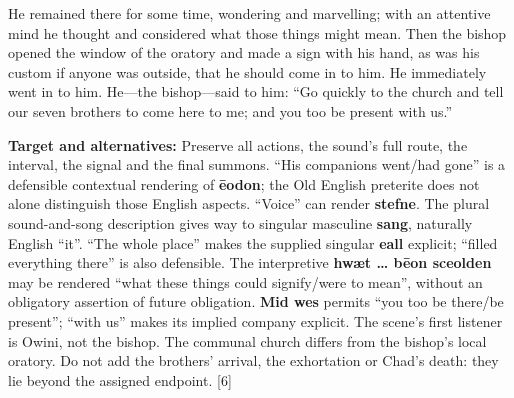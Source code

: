 He remained there for some time, wondering and marvelling; with an attentive mind he thought and considered what those things might mean. Then the bishop opened the window of the oratory and made a sign with his hand, as was his custom if anyone was outside, that he should come in to him. He immediately went in to him. He—the bishop—said to him: “Go quickly to the church and tell our seven brothers to come here to me; and you too be present with us.”

\textbf{Target and alternatives:} Preserve all actions, the sound’s full route, the interval, the signal and the final summons. “His companions went/\allowbreak{}had gone” is a defensible contextual rendering of \textbf{ēodon}; the Old English preterite does not alone distinguish those English aspects. “Voice” can render \textbf{stefne}. The plural sound-and-song description gives way to singular masculine \textbf{sang}, naturally English “it”. “The whole place” makes the supplied singular \textbf{eall} explicit; “filled everything there” is also defensible. The interpretive \textbf{hwæt … bēon sceolden} may be rendered “what these things could signify/\allowbreak{}were to mean”, without an obligatory assertion of future obligation. \textbf{Mid wes} permits “you too be there/\allowbreak{}be present”; “with us” makes its implied company explicit. The scene’s first listener is Owini, not the bishop. The communal church differs from the bishop’s local oratory. Do not add the brothers’ arrival, the exhortation or Chad’s death: they lie beyond the assigned endpoint. [6]

